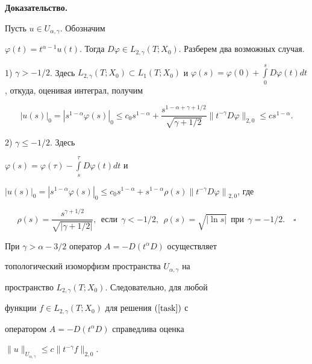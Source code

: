 {\bf Доказательство.}


Пусть $u \in U_{\alpha,\gamma}$. Обозначим


$\varphi(t)=t^{\alpha-1}u(t)$. Тогда $D \varphi \in


L_{2,\gamma}(T;X_0)$. Разберем два возможных случая.





1) $\gamma > -1/2$. Здесь $L_{2,\gamma}(T;X_0) \subset


L_1(T;X_0)$ и $\varphi(s)=\varphi(0)+\int\limits_0^s D \varphi(t)


d t$, откуда, оценивая интеграл, получим


$$


|u(s)|_0=|s^{1-\alpha}\varphi(s)|_0 \le c_0 s^{1-\alpha} +


\frac{s^{1-\alpha+\gamma+1/2}}{\sqrt{\gamma+1/2}}


\|t^{-\gamma}D\varphi\|_{2,0}\le c s^{1-\alpha}.


$$





2) $\gamma \le -1/2$. Здесь


$\varphi(s)=\varphi(\tau)-\int\limits_s^\tau D \varphi(t) d t$ и


$|u(s)|_0=|s^{1-\alpha}\varphi(s)|_0 \le c_0


s^{1-\alpha}+s^{1-\alpha}\rho(s){\|t^{-\gamma}D\varphi\|}_{2,0}$, где


$$


\rho(s)=\frac{s^{\gamma+1/2}}{\sqrt{|\gamma+1/2|}},


\ \ \text{если} \ \ \gamma < -1/2, \ \ \rho(s)=\sqrt{|\ln s|}


\ \ \text{при} \ \ \gamma=-1/2.\quad\square


$$





\begin{thms}\label{subestim}


При $\gamma>\alpha-3/2$ оператор $A=-D(t^\alpha D)$ осуществляет


топологический изоморфизм пространства $U_{\alpha,\gamma}$ на


пространство $L_{2,\gamma}(T;X_0)$. Следовательно, для любой


функции $f \in L_{2,\gamma}(T;X_0)$ для решения $(\ref{task})$ с


оператором $A=-D(t^\alpha D)$ справедлива оценка


$\|u\|_{U_{\alpha,\gamma}} \le c \|t^{-\gamma}f\|_{2,0}$.


\end{thms}





